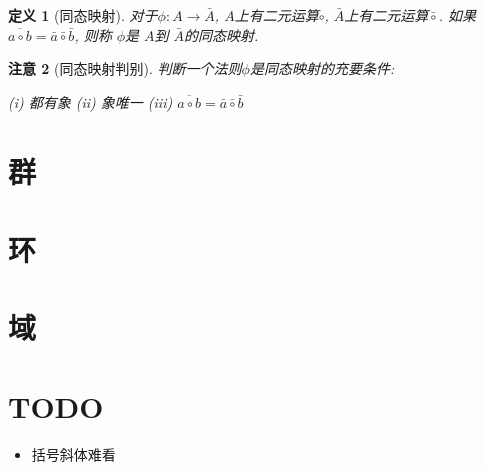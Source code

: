 \documentclass[UTF8]{ctexart}
\newtheorem{Definition}{\hspace{2em}定义}%
\newtheorem{Remark}[Definition]{\hspace{2em}注意}
\begin{document}
\begin{Definition}[同态映射]
对于$\phi: A \rightarrow \bar{A}$, $A$上有二元运算$\circ$, $\bar{A}$上有二元运算$\bar{\circ}$.
如果
$ \overline{a \circ b} = \bar{a} \bar{\circ} \bar{b}$, 则称 $\phi$是 $A$到 $\bar{A}$的同态映射.
\end{Definition}

\begin{Remark}[同态映射判别]
 判断一个法则$\phi$是同态映射的充要条件: \\

\centerline{(i) 都有象 (ii) 象唯一 (iii) $ \overline{a \circ b} = \bar{a} \bar{\circ} \bar{b}$}
\end{Remark}



\section{群}
\section{环}
\section{域}
\section{TODO}
\begin{itemize}
	\item 括号斜体难看
\end{itemize}
\end{document}
